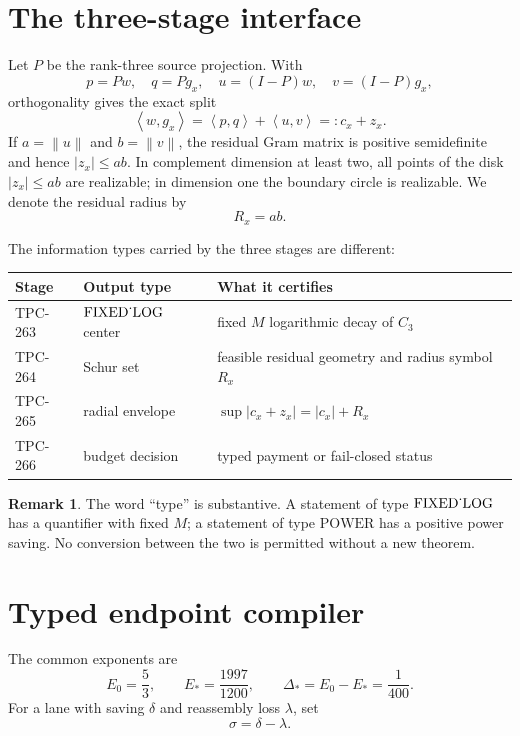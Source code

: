 \documentclass[11pt]{article}
\theoremstyle{definition}
\newtheorem{remark}{Remark}
\newcommand{\ip}[2]{\left\langle #1,#2\right\rangle}
\newcommand{\norm}[1]{\left\lVert #1\right\rVert}
\newcommand{\Pow}{\mathrm{POWER}}
\newcommand{\LogType}{\mathrm{FIXED\mathchar`\_LOG}}
\begin{document}
\section{The three-stage interface}

Let $P$ be the rank-three source projection.  With
\[
 p=Pw,\quad q=Pg_x,\quad u=(I-P)w,\quad v=(I-P)g_x,
\]
orthogonality gives the exact split
\begin{equation}
 \ip{w}{g_x}=\ip{p}{q}+\ip{u}{v}=:c_x+z_x.
 \label{eq:split}
\end{equation}
If $a=\norm{u}$ and $b=\norm{v}$, the residual Gram matrix is positive
semidefinite and hence $|z_x|\leq ab$.  In complement dimension at least two,
all points of the disk $|z_x|\leq ab$ are realizable; in dimension one the
boundary circle is realizable.  We denote the residual radius by
\[
 R_x=ab.
\]

The information types carried by the three stages are different:
\begin{center}
\begin{tabular}{lll}
\toprule
Stage & Output type & What it certifies\\
\midrule
TPC-263 & $\LogType$ center & fixed $M$ logarithmic decay of $C_3$\\
TPC-264 & Schur set & feasible residual geometry and radius symbol $R_x$\\
TPC-265 & radial envelope & $\sup|c_x+z_x|=|c_x|+R_x$\\
TPC-266 & budget decision & typed payment or fail-closed status\\
\bottomrule
\end{tabular}
\end{center}

\begin{remark}
The word ``type'' is substantive.  A statement of type $\LogType$ has a
quantifier with fixed $M$; a statement of type $\Pow$ has a positive power
saving.  No conversion between the two is permitted without a new theorem.
\end{remark}

\section{Typed endpoint compiler}

The common exponents are
\[
 E_0=\frac53, \qquad E_*=\frac{1997}{1200}, \qquad
 \Delta_*=E_0-E_* = \frac1{400}.
\]
For a lane with saving $\delta$ and reassembly loss $\lambda$, set
\[
 \sigma=\delta-\lambda.
\]
\end{document}
